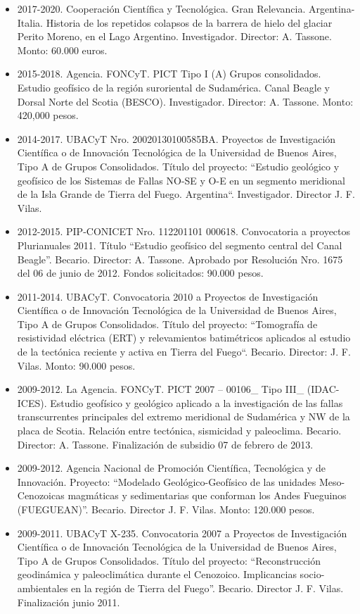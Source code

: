 \documentclass[11pt, a4paper]{article}
\begin{document}
\begin{itemize}
    \item 2017-2020. Cooperación Científica y Tecnológica. Gran Relevancia. Argentina-Italia. Historia de los repetidos colapsos de la barrera de hielo del glaciar Perito Moreno, en el Lago Argentino. Investigador. Director: A. Tassone. Monto: 60.000 euros.
    \item 2015-2018. Agencia. FONCyT. PICT Tipo I (A) Grupos consolidados. Estudio geofísico de la región suroriental de Sudamérica. Canal Beagle y Dorsal Norte del Scotia (BESCO). Investigador. Director: A. Tassone. Monto: 420,000 pesos.
    \item 2014-2017. UBACyT Nro. 20020130100585BA. Proyectos de Investigación Científica o de Innovación Tecnológica de la Universidad de Buenos Aires, Tipo A de Grupos Consolidados. Título del proyecto: “Estudio geológico y geofísico de los Sistemas de Fallas NO-SE y O-E en un segmento meridional de la Isla Grande de Tierra del Fuego. Argentina“. Investigador. Director J. F. Vilas.
    \item 2012-2015. PIP-CONICET Nro. 112201101 000618. Convocatoria a proyectos Plurianuales 2011. Título “Estudio geofísico del segmento central del Canal Beagle”. Becario. Director: A. Tassone. Aprobado por Resolución Nro. 1675 del 06 de junio de 2012. Fondos solicitados: 90.000 pesos.
    \item 2011-2014. UBACyT. Convocatoria 2010 a Proyectos de Investigación Científica o de Innovación Tecnológica de la Universidad de Buenos Aires, Tipo A de Grupos Consolidados. Título del proyecto: “Tomografía de resistividad eléctrica (ERT) y relevamientos batimétricos aplicados al estudio de la tectónica reciente y activa en Tierra del Fuego“. Becario. Director: J. F. Vilas. Monto: 90.000 pesos.
    \item 2009-2012. La Agencia. FONCyT. PICT 2007 – 00106\_ Tipo III\_ (IDAC-ICES). Estudio geofísico y geológico aplicado a la investigación de las fallas transcurrentes principales del extremo meridional de Sudamérica y NW de la placa de Scotia. Relación entre tectónica, sismicidad y paleoclima. Becario. Director: A. Tassone. Finalización de subsidio 07 de febrero de 2013.
    \item 2009-2012. Agencia Nacional de Promoción Científica, Tecnológica y de Innovación. Proyecto: “Modelado Geológico-Geofísico de las unidades Meso-Cenozoicas magmáticas y sedimentarias que conforman los Andes Fueguinos (FUEGUEAN)”. Becario. Director J. F. Vilas. Monto: 120.000 pesos.
    \item 2009-2011. UBACyT X-235. Convocatoria 2007 a Proyectos de Investigación Científica o de Innovación Tecnológica de la Universidad de Buenos Aires, Tipo A de Grupos Consolidados. Título del proyecto: “Reconstrucción geodinámica y paleoclimática durante el Cenozoico. Implicancias socio-ambientales en la región de Tierra del Fuego”. Becario. Director J. F. Vilas. Finalización junio 2011.

\end{itemize}
\end{document}
